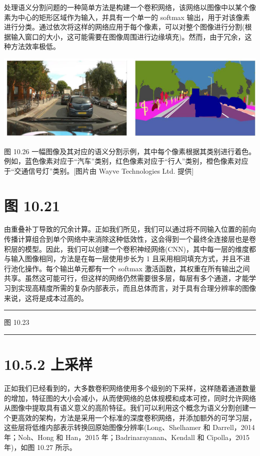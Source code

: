 \documentclass[10pt]{article}
\newcommand{\HRule}{\begin{center}\rule{0.9\linewidth}{0.2mm}\end{center}}
\begin{document}
处理语义分割问题的一种简单方法是构建一个卷积网络，该网络以图像中以某个像素为中心的矩形区域作为输入，并具有一个单一的 softmax 输出，用于对该像素进行分类。通过依次将这样的网络应用于每个像素，可以对整个图像进行分割(根据输入窗口的大小，这可能需要在图像周围进行边缘填充)。然而，由于冗余，这种方法效率极低。

\begin{center}
\includegraphics[max width=1.0\textwidth]{images/0194e279-9b28-703a-88f4-c3ac21e2010d_335_240_346_1305_407_0.jpg}
\end{center}
\hspace*{3em} 

图 10.26 一幅图像及其对应的语义分割示例，其中每个像素根据其类别进行着色。例如，蓝色像素对应于“汽车”类别，红色像素对应于“行人”类别，橙色像素对应于“交通信号灯”类别。[图片由 Wayve Technologies Ltd. 提供]

\section*{图 10.21}

由重叠补丁导致的冗余计算。正如我们所见，我们可以通过将不同输入位置的前向传播计算组合到单个网络中来消除这种低效性，这会得到一个最终全连接层也是卷积层的模型。因此，我们可以创建一个卷积神经网络(CNN)，其中每一层的维度都与输入图像相同，方法是在每一层使用步长为 1 且采用相同填充方式，并且不进行池化操作。每个输出单元都有一个 softmax 激活函数，其权重在所有输出之间共享。虽然这可能可行，但这样的网络仍然需要很多层，每层有多个通道，才能学习到实现高精度所需的复杂内部表示，而且总体而言，对于具有合理分辨率的图像来说，这将是成本过高的。

\HRule

图 10.23

\HRule

\section*{10.5.2 上采样}

正如我们已经看到的，大多数卷积网络使用多个级别的下采样，这样随着通道数量的增加，特征图的大小会减小，从而使网络的总体规模和成本可控，同时允许网络从图像中提取具有语义意义的高阶特征。我们可以利用这个概念为语义分割创建一个更高效的架构，方法是采用一个标准的深度卷积网络，并添加额外的可学习层，这些层将低维内部表示转换回原始图像分辨率(Long、Shelhamer 和 Darrell，2014 年；Noh、Hong 和 Han，2015 年；Badrinarayanan、Kendall 和 Cipolla，2015 年)，如图 10.27 所示。
\end{document}
